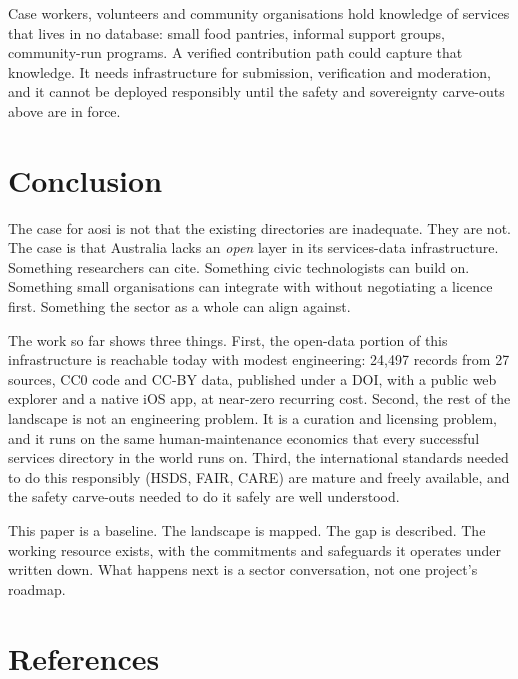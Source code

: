 \documentclass[11pt,a4paper]{article}
\begin{document}
Case workers, volunteers and community organisations hold knowledge of services that lives in no database: small food pantries, informal support groups, community-run programs. A verified contribution path could capture that knowledge. It needs infrastructure for submission, verification and moderation, and it cannot be deployed responsibly until the safety and sovereignty carve-outs above are in force.


\section{Conclusion}

The case for aosi is not that the existing directories are inadequate. They are not. The case is that Australia lacks an \emph{open} layer in its services-data infrastructure. Something researchers can cite. Something civic technologists can build on. Something small organisations can integrate with without negotiating a licence first. Something the sector as a whole can align against.

The work so far shows three things. First, the open-data portion of this infrastructure is reachable today with modest engineering: 24{,}497 records from 27 sources, CC0 code and CC-BY data, published under a DOI, with a public web explorer and a native iOS app, at near-zero recurring cost. Second, the rest of the landscape is not an engineering problem. It is a curation and licensing problem, and it runs on the same human-maintenance economics that every successful services directory in the world runs on. Third, the international standards needed to do this responsibly (HSDS, FAIR, CARE) are mature and freely available, and the safety carve-outs needed to do it safely are well understood.

This paper is a baseline. The landscape is mapped. The gap is described. The working resource exists, with the commitments and safeguards it operates under written down. What happens next is a sector conversation, not one project's roadmap.

\section*{References}
\end{document}
